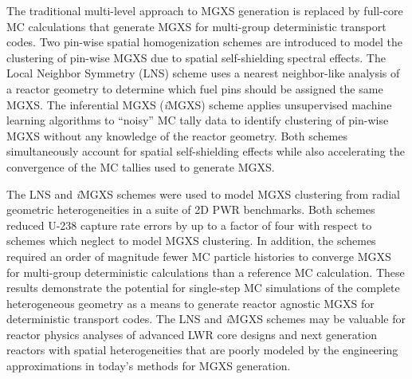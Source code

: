\begin{abstractpage}

The traditional multi-level approach to MGXS generation is replaced by full-core MC calculations that generate MGXS for multi-group deterministic transport codes. Two pin-wise spatial homogenization schemes are introduced to model the clustering of pin-wise MGXS due to spatial self-shielding spectral effects. The Local Neighbor Symmetry (LNS) scheme uses a nearest neighbor-like analysis of a reactor geometry to determine which fuel pins should be assigned the same MGXS. The inferential MGXS (\textit{i}MGXS) scheme applies unsupervised machine learning algorithms to ``noisy'' MC tally data to identify clustering of pin-wise MGXS without any knowledge of the reactor geometry. Both schemes simultaneously account for spatial self-shielding effects while also accelerating the convergence of the MC tallies used to generate MGXS.




The LNS and \textit{i}MGXS schemes were used to model MGXS clustering from radial geometric heterogeneities in a suite of 2D PWR benchmarks. Both schemes reduced U-238 capture rate errors by up to a factor of four with respect to schemes which neglect to model MGXS clustering. In addition, the schemes required an order of magnitude fewer MC particle histories to converge MGXS for multi-group deterministic calculations than a reference MC calculation. These results demonstrate the potential for single-step MC simulations of the complete heterogeneous geometry as a means to generate reactor agnostic MGXS for deterministic transport codes. The LNS and \textit{i}MGXS schemes may be valuable for reactor physics analyses of advanced LWR core designs and next generation reactors with spatial heterogeneities that are poorly modeled by the engineering approximations in today's methods for MGXS generation.


\end{abstractpage}
